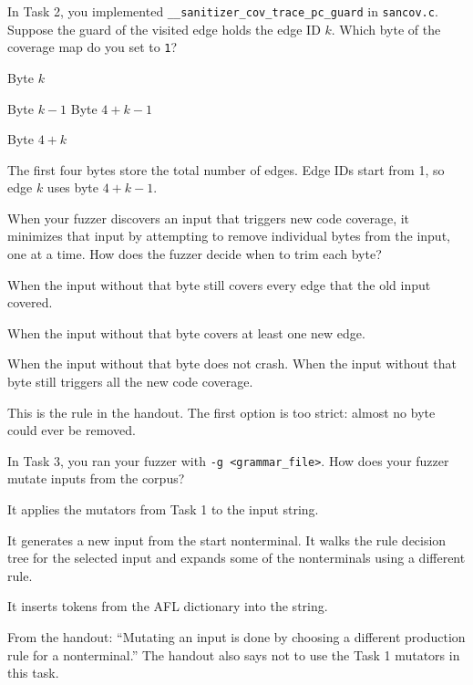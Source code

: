 \documentclass[addpoints]{exam}
\newcommand{\Code}[1]{\texttt{#1}}
\begin{document}
\begin{questions}
  \vspace{12pt}
\question[1] In Task 2, you implemented
  \Code{__sanitizer_cov_trace_pc_guard} in \Code{sancov.c}. Suppose
  the guard of the visited edge holds the edge ID $k$. Which byte of
  the coverage map do you set to \Code{1}?
  \begin{choices}
  \item Byte $k$
  \item Byte $k - 1$
  \CorrectChoice Byte $4 + k - 1$
  \item Byte $4 + k$
  \end{choices}
  \begin{solution}
    The first four bytes store the total number of edges. Edge IDs
    start from 1, so edge $k$ uses byte $4 + k - 1$.
  \end{solution}

  \vspace{12pt}
\question[1] When your fuzzer discovers an input that triggers new
  code coverage, it minimizes that input by attempting to remove
  individual bytes from the input, one at a time. How does the fuzzer
  decide when to trim each byte?
  \begin{choices}
  \item When the input without that byte still covers every edge that
    the old input covered.
  \item When the input without that byte covers at least one new edge.
  \item When the input without that byte does not crash.
    \CorrectChoice When the input without that byte still triggers all
    the new code coverage.
  \end{choices}
  \begin{solution}
    This is the rule in the handout. The first option is too strict:
    almost no byte could ever be removed.
  \end{solution}

  \vspace{12pt}
\question[2] In Task 3, you ran your fuzzer with \Code{-g
    <grammar_file>}. How does your fuzzer mutate inputs from the
  corpus?
  \begin{choices}
  \item It applies the mutators from Task 1 to the input string.
  \item It generates a new input from the start nonterminal.
    \CorrectChoice It walks the rule decision tree for the selected
    input and expands some of the nonterminals using a different rule.
  \item It inserts tokens from the AFL dictionary into the string.
  \end{choices}
  \begin{solution}
    From the handout: ``Mutating an input is done by choosing a
    different production rule for a nonterminal.'' The handout also
    says not to use the Task 1 mutators in this task.
  \end{solution}


\end{questions}
\end{document}
